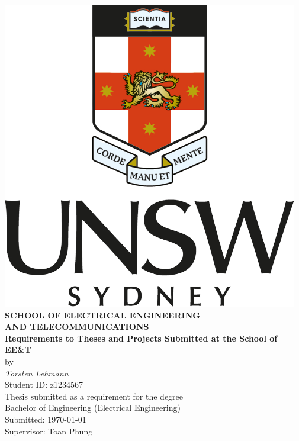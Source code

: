 \begin{center}
\includegraphics[width=0.33\linewidth]{img/UNSW_logo.png}\\[0.5cm]
\textbf{\large SCHOOL OF ELECTRICAL ENGINEERING\\
AND TELECOMMUNICATIONS}\\[2cm]
{\addtolength{\baselineskip}{0.5cm}
\textbf{\Huge
Requirements to Theses and Projects Submitted at the School of EE\&T} \\[0.5cm]
}
{\Large by}\\[0.5cm]
\textit{\huge
Torsten Lehmann}\\[0.5cm]
{\Large
Student ID: z1234567}\\[1.5cm]
{\Large
Thesis submitted as a requirement for the degree\\
Bachelor of Engineering (Electrical Engineering)\\[2ex]
\vfill
Submitted: \today\\
Supervisor: Toan Phung
\vspace*{-1cm}
}
\end{center}



